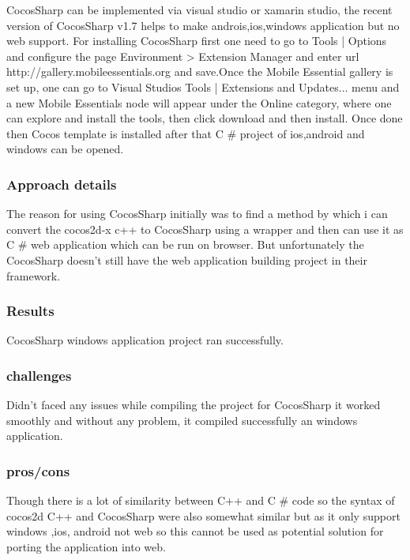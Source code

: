 \documentclass[23pt]{article}
\begin{document}
{\Large CocosSharp can be implemented via visual studio or xamarin studio, the recent version of CocosSharp v1.7 helps to make androis,ios,windows application but no web support. For installing CocosSharp first one need to go to Tools | Options and configure the page Environment > Extension Manager and enter  url http://gallery.mobileessentials.org and save.Once the Mobile Essential gallery is set up, one can go to Visual Studios Tools | Extensions and Updates... menu and a new Mobile Essentials node will appear under the Online category, where one can explore and install the tools, then click download and then install. Once done then Cocos template is installed after that C \#  project of ios,android and windows can be opened. \par}


\subsubsection{Approach details}

{\Large The reason for using CocosSharp initially was to find a method by which i can convert the cocos2d-x c++ to CocosSharp using a wrapper and then can use it as C \# web application which can be run on browser. But unfortunately the CocosSharp doesn’t still have the web application building project in their framework. \par}

\subsubsection{Results}

{\Large CocosSharp windows application project ran successfully. \par}

\subsubsection{challenges}

{\Large Didn’t faced any issues while compiling the project for CocosSharp it worked smoothly and without any problem, it compiled successfully an windows application. \par}

\subsubsection{pros/cons}

{\Large Though there is a lot of similarity between C++ and C \# code so the syntax of cocos2d C++ and CocosSharp were also somewhat similar but as it only support windows ,ios, android not web so this cannot be used as potential solution for porting the application into web. \par}
\end{document}
